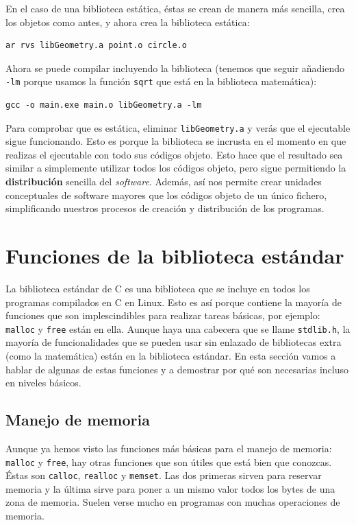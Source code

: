 \documentclass[a4paper]{article}
\begin{document}
En el caso de una biblioteca estática, éstas se crean de manera más sencilla,
crea los objetos como antes, y ahora crea la biblioteca estática:

\begin{verbatim}
ar rvs libGeometry.a point.o circle.o
\end{verbatim}

Ahora se puede compilar incluyendo la biblioteca (tenemos que seguir añadiendo
\verb!-lm! porque usamos la función \verb!sqrt! que está en la biblioteca
matemática):

\begin{verbatim}
gcc -o main.exe main.o libGeometry.a -lm
\end{verbatim}

Para comprobar que es estática, eliminar \verb!libGeometry.a! y verás que el
ejecutable sigue funcionando. Esto es porque la biblioteca se incrusta en
el momento en que realizas el ejecutable con todo sus códigos objeto. Esto hace
que el resultado sea similar a simplemente utilizar todos los códigos objeto,
pero sigue permitiendo la \textbf{distribución} sencilla del \emph{software}.
Además, así nos permite crear unidades conceptuales de software mayores que
los códigos objeto de un único fichero, simplificando nuestros procesos de
creación y distribución de los programas.


\section{Funciones de la biblioteca estándar}
La biblioteca estándar de C es una biblioteca que se incluye en todos los
programas compilados en C en Linux. Esto es así porque contiene la mayoría
de funciones que son implescindibles para realizar tareas básicas, por ejemplo:
\verb!malloc! y \verb!free! están en ella. Aunque haya una cabecera que se llame
\verb!stdlib.h!, la mayoría de funcionalidades que se pueden usar sin enlazado
de bibliotecas extra (como la matemática) están en la biblioteca estándar.
En esta sección vamos a hablar de algunas de estas funciones y a demostrar por
qué son necesarias incluso en niveles básicos.

\subsection{Manejo de memoria}
Aunque ya hemos visto las funciones más básicas para el manejo de memoria:
\verb!malloc! y \verb!free!, hay otras funciones que son útiles que está bien
que conozcas. Éstas son \verb!calloc!, \verb!realloc! y \verb!memset!. Las dos
primeras sirven para reservar memoria y la última sirve para poner a un mismo
valor todos los bytes de una zona de memoria. Suelen verse mucho en programas
con muchas operaciones de memoria.
\end{document}
